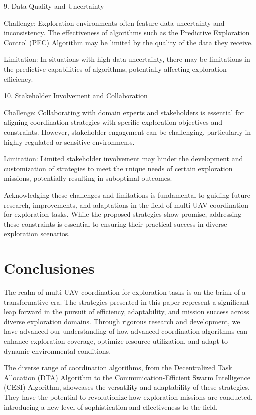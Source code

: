\documentclass[sigconf]{acmart}
\begin{document}
9. Data Quality and Uncertainty

    Challenge: Exploration environments often feature data uncertainty and inconsistency. The effectiveness of algorithms such as the Predictive Exploration Control (PEC) Algorithm may be limited by the quality of the data they receive.

    Limitation: In situations with high data uncertainty, there may be limitations in the predictive capabilities of algorithms, potentially affecting exploration efficiency.

10. Stakeholder Involvement and Collaboration

    Challenge: Collaborating with domain experts and stakeholders is essential for aligning coordination strategies with specific exploration objectives and constraints. However, stakeholder engagement can be challenging, particularly in highly regulated or sensitive environments.

    Limitation: Limited stakeholder involvement may hinder the development and customization of strategies to meet the unique needs of certain exploration missions, potentially resulting in suboptimal outcomes.

Acknowledging these challenges and limitations is fundamental to guiding future research, improvements, and adaptations in the field of multi-UAV coordination for exploration tasks. While the proposed strategies show promise, addressing these constraints is essential to ensuring their practical success in diverse exploration scenarios.

\section{Conclusiones}


The realm of multi-UAV coordination for exploration tasks is on the brink of a transformative era. The strategies presented in this paper represent a significant leap forward in the pursuit of efficiency, adaptability, and mission success across diverse exploration domains. Through rigorous research and development, we have advanced our understanding of how advanced coordination algorithms can enhance exploration coverage, optimize resource utilization, and adapt to dynamic environmental conditions.

The diverse range of coordination algorithms, from the Decentralized Task Allocation (DTA) Algorithm to the Communication-Efficient Swarm Intelligence (CESI) Algorithm, showcases the versatility and adaptability of these strategies. They have the potential to revolutionize how exploration missions are conducted, introducing a new level of sophistication and effectiveness to the field.
\end{document}
